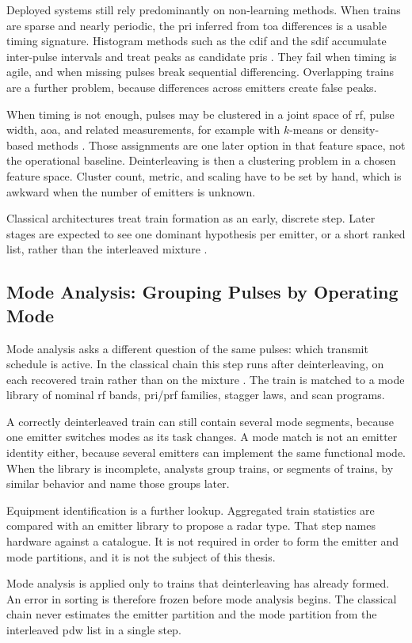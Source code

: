 Deployed systems still rely predominantly on non-learning methods.
When trains are sparse and nearly periodic, the \gls{pri} inferred from \gls{toa} differences is a usable timing signature.
Histogram methods such as the \gls{cdif} and the \gls{sdif} accumulate inter-pulse intervals and treat peaks as candidate \glspl{pri} \parencite{wiley2006elint,qu2026radardeinterleavingreview}.
They fail when timing is agile, and when missing pulses break sequential differencing.
Overlapping trains are a further problem, because differences across emitters create false peaks.

When timing is not enough, pulses may be clustered in a joint space of \gls{rf}, pulse width, \gls{aoa}, and related measurements, for example with $k$-means or density-based methods \parencite{ester1996density,qu2026radardeinterleavingreview}.
Those assignments are one later option in that feature space, not the operational baseline.
Deinterleaving is then a clustering problem in a chosen feature space.
Cluster count, metric, and scaling have to be set by hand, which is awkward when the number of emitters is unknown.

Classical architectures treat train formation as an early, discrete step. Later stages are expected to see one dominant hypothesis per emitter, or a short ranked list, rather than the interleaved mixture \parencite{wiley2006elint}.

\subsection{Mode Analysis: Grouping Pulses by Operating Mode}

Mode analysis asks a different question of the same pulses: which transmit schedule is active.
In the classical chain this step runs after deinterleaving, on each recovered train rather than on the mixture \parencite{wiley2006elint}.
The train is matched to a mode library of nominal \gls{rf} bands, \gls{pri}/\gls{prf} families, stagger laws, and scan programs.

A correctly deinterleaved train can still contain several mode segments, because one emitter switches modes as its task changes.
A mode match is not an emitter identity either, because several emitters can implement the same functional mode.
When the library is incomplete, analysts group trains, or segments of trains, by similar behavior and name those groups later.

Equipment identification is a further lookup. Aggregated train statistics are compared with an emitter library to propose a radar type.
That step names hardware against a catalogue. It is not required in order to form the emitter and mode partitions, and it is not the subject of this thesis.

Mode analysis is applied only to trains that deinterleaving has already formed.
An error in sorting is therefore frozen before mode analysis begins.
The classical chain never estimates the emitter partition and the mode partition from the interleaved \gls{pdw} list in a single step.
